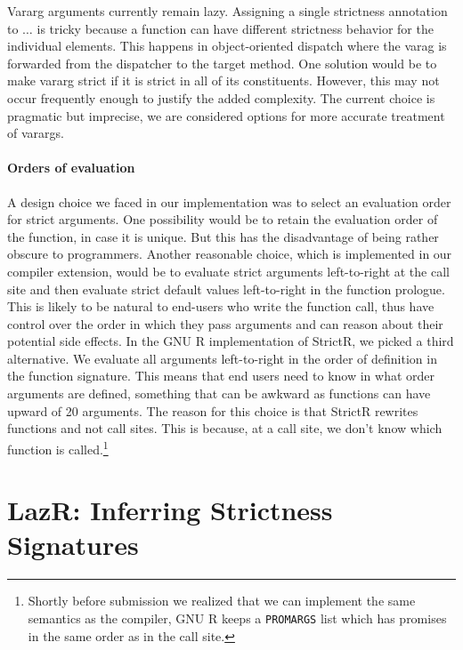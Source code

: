 \documentclass[review,nonacm,screen,acmsmall,anonymous=true]{acmart}
\renewcommand{\c}[1]{\lstinline |#1|\xspace}
\newcommand{\strictr}{{\sf StrictR}\xspace}
\begin{document}
Vararg arguments currently remain lazy. Assigning a single strictness annotation
to $\dots$ is tricky because a function can have different strictness behavior
for the individual elements. This happens in object-oriented dispatch where the
varag is forwarded from the dispatcher to the target method. One solution would
be to make vararg strict if it is strict in all of its constituents. However,
this may not occur frequently enough to justify the added complexity. The
current choice is pragmatic but imprecise, we are considered options for more
accurate treatment of varargs.


\paragraph{Orders of evaluation} A design choice we faced in our
implementation was to select an evaluation order for strict arguments. One
possibility would be to retain the evaluation order of the function, in case it
is unique. But this has the disadvantage of being rather obscure to programmers.
Another reasonable choice, which is implemented in our compiler extension, would
be to evaluate strict arguments left-to-right at the call site and then evaluate
strict default values left-to-right in the function prologue. This is likely to
be natural to end-users who write the function call, thus have control over the
order in which they pass arguments and can reason about their potential side
effects. In the GNU R implementation of \strictr, we picked a third alternative.
We evaluate all arguments left-to-right in the order of definition in the
function signature. This means that end users need to know in what order
arguments are defined, something that can be awkward as functions can have
upward of 20 arguments. The reason for this choice is that \strictr rewrites
functions and not call sites. This is because, at a call site, we
don't know which function is called.\footnote{Shortly before submission we
realized that we can implement the same semantics as the compiler, GNU R keeps a
\c{PROMARGS} list which has promises in the same order as in the call site. }


\newpage
\section{LazR: Inferring Strictness Signatures}\label{sec:lazr}
\end{document}
